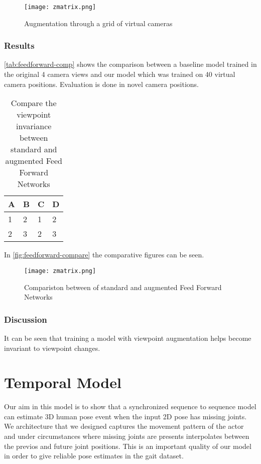 \begin{figure}[htpb]
    \texttt{[image: zmatrix.png]}
    \caption{Augmentation through a grid of virtual cameras}
    \label{fig:grid-pattern}
\end{figure}

\subsubsection{Results}

\autoref{tab:feedforward-comp} shows the comparison between a baseline model trained in the original 4 camera views and our model which was trained on 40 virtual camera positions. Evaluation is done in novel camera positions.

\begin{table}[htpb]
    \centering
    \begin{tabular}{l l l l}
        \toprule
            A & B & C & D \\
        \midrule
            1 & 2 & 1 & 2 \\
            2 & 3 & 2 & 3 \\
        \bottomrule
    \end{tabular}
    \caption[Comparison Feed Forward Network]{Compare the viewpoint invariance between standard and augmented Feed Forward Networks}\label{tab:feedforward-comp}
\end{table}



In \autoref{fig:feedforward-compare} the comparative figures can be seen. 

\begin{figure}[htpb]
    \texttt{[image: zmatrix.png]}
    \caption{Compariston between of standard and augmented Feed Forward Networks}
    \label{fig:feedforward-compare}
\end{figure}

\subsubsection{Discussion}

It can be seen that training a model with viewpoint augmentation helps become invariant to viewpoint changes.


\section{Temporal Model}

Our aim in this model is to show that a synchronized sequence to sequence model can estimate 3D human pose event when the input 2D pose has missing joints. We architecture that we designed captures the movement pattern of the actor and under circumstances where missing joints are presents interpolates between the previos and future joint positions. This is an important quality of our model in order to give reliable pose estimates in the gait dataset. 

